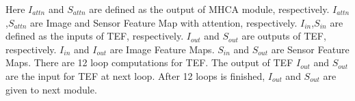 \documentclass[acmsmall,manuscript, screen, review]{acmart}
\begin{document}
Here \begin{math}
  I_{attn}
\end{math} and \begin{math}
  S_{attn}
\end{math} are defined as the output of MHCA module, respectively. \begin{math}
  I_{attn}
\end{math},\begin{math}
  S_{attn}
\end{math} are Image and Sensor Feature Map with attention, respectively. \begin{math}
  I_{in}
\end{math},\begin{math}
  S_{in}
\end{math} are defined as the inputs of TEF, respectively. \begin{math}
  I_{out}
\end{math} and \begin{math}
  S_{out}
\end{math} are outputs of TEF, respectively. \begin{math}
  I_{in}
\end{math} and \begin{math}
  I_{out}
\end{math} are Image Feature Maps. \begin{math}
  S_{in}
\end{math} and \begin{math}
  S_{out}
\end{math} are Sensor Feature Maps. There are 12 loop computations for TEF. The output of TEF \begin{math}
  I_{out}
\end{math} and \begin{math}
  S_{out}
\end{math} are the input for TEF at next loop. After 12 loops is finished, \begin{math}
  I_{out}
\end{math} and \begin{math}
  S_{out}
\end{math} are given to next module.
\end{document}
